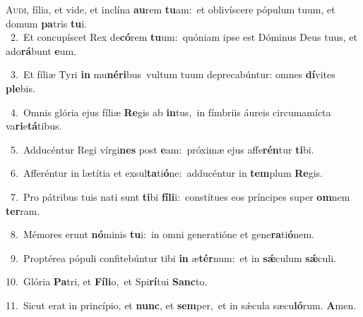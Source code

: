 \lettrine{\initial\textcolor{\initialcolor}{A}}{udi,} fília, et vide, et inclína \textbf{au}\-rem \textbf{tu}\-am:~\star et oblivíscere pópulum tuum, et domum \textbf{pa}\-tris \textbf{tu}\-i.\\
{\numbfont\textcolor{\numbcolor}{~2.}}~Et concupíscet Rex de\-\textbf{có}\-rem \textbf{tu}\-um:~\star quóniam ipse est Dóminus Deus tuus, et ado\-\textbf{rá}\-bunt \textbf{e}\-um.\par
{\numbfont\textcolor{\numbcolor}{~3.}}~Et fíliæ Tyri \textbf{in} mu\-\textbf{né}\-\textbf{ri}bus~\star vultum tuum deprecabúntur: omnes \textbf{dí}\-vites \textbf{ple}\-bis.\par
{\numbfont\textcolor{\numbcolor}{~4.}}~Omnis glória ejus fíliæ \textbf{Re}\-gis ab \textbf{in}\-tus,~\star in fímbriis áureis circumamícta va\-\textbf{ri}\-e\-\textbf{tá}\-tibus.\par
{\numbfont\textcolor{\numbcolor}{~5.}}~Adducéntur Regi vírgi\textbf{nes} post \textbf{e}\-am:~\star próximæ ejus affe\-\textbf{rén}\-tur \textbf{ti}\-bi.\par
{\numbfont\textcolor{\numbcolor}{~6.}}~Afferéntur in lætítia et exsul\-\textbf{ta}\-ti\-\textbf{ó}\-ne:~\star adducéntur in \textbf{tem}\-plum \textbf{Re}\-gis.\par
{\numbfont\textcolor{\numbcolor}{~7.}}~Pro pátribus tuis nati sunt \textbf{ti}\-bi \textbf{fí}\-\textbf{li}i:~\star constítues eos príncipes super \textbf{om}\-nem \textbf{ter}\-ram.\par
{\numbfont\textcolor{\numbcolor}{~8.}}~Mémores erunt \textbf{nó}\-minis \textbf{tu}\-i:~\star in omni generatióne et gene\-\textbf{ra}\-ti\-\textbf{ó}\-nem.\par
{\numbfont\textcolor{\numbcolor}{~9.}}~Proptérea pópuli confitebúntur tibi \textbf{in} æ\-\textbf{tér}\-num:~\star et in \textbf{sǽ}\-culum \textbf{sǽ}\-culi.\par
{\numbfont\textcolor{\numbcolor}{10.}}~Glória \textbf{Pa}\-tri, et \textbf{Fí}\-\textbf{li}o,~\star et Spi\-\textbf{rí}\-tui \textbf{Sanc}\-to.\par
{\numbfont\textcolor{\numbcolor}{11.}}~Sicut erat in princípio, et \textbf{nunc}\-, et \textbf{sem}\-per,~\star et in sǽcula sæcu\-\textbf{ló}\-rum. \textbf{A}\-men.\par
